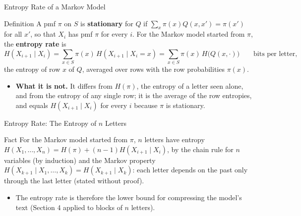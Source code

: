 \begin{frame}{Entropy Rate of a Markov Model}
  \small
  \begin{block}{Definition}
    A pmf $\pi$ on $S$ is \textbf{stationary} for $Q$ if $\sum_x\pi(x)Q(x,x')=\pi(x')$ for all $x'$, so that $X_i$ has pmf $\pi$ for every $i$. For the Markov model started from $\pi$, the \textbf{entropy rate} is
    \[
      H(X_{i+1}\mid X_i)=\sum_{x\in S}\pi(x)\,H(X_{i+1}\mid X_i=x)=\sum_{x\in S}\pi(x)\,H\big(Q(x,\cdot)\big)\qquad\text{bits per letter},
    \]
    the entropy of row $x$ of $Q$, averaged over rows with the row probabilities $\pi(x)$.
  \end{block}
  \begin{itemize}
    \item \textbf{What it is not.} It differs from $H(\pi)$, the entropy of a letter seen alone, and from the entropy of any single row; it is the average of the row entropies, and equals $H(X_{i+1}\mid X_i)$ for every $i$ because $\pi$ is stationary.
  \end{itemize}
\end{frame}

\begin{frame}{Entropy Rate: The Entropy of $n$ Letters}
  \small
  \begin{block}{Fact}
    For the Markov model started from $\pi$, $n$ letters have entropy $H(X_1,\dots,X_n)=H(\pi)+(n-1)H(X_{i+1}\mid X_i)$, by the chain rule for $n$ variables (by induction) and the Markov property $H(X_{k+1}\mid X_1,\dots,X_k)=H(X_{k+1}\mid X_k)$: each letter depends on the past only through the last letter (stated without proof).
  \end{block}
  \begin{itemize}
    \item The entropy rate is therefore the lower bound for compressing the model's text (Section 4 applied to blocks of $n$ letters).
  \end{itemize}
\end{frame}

